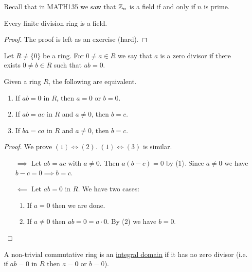 \documentclass[11pt]{article}
\begin{document}
\begin{remark}
    Recall that in MATH135 we saw that $\mathbb{Z}_n$ is a field if and only if $n$ is prime.
\end{remark}

\begin{theorem}
    Every finite division ring is a field.
\end{theorem}

\begin{proof}
    The proof is left as an exercise (hard).
\end{proof}

\begin{definition}
    Let $R\neq\{0\}$ be a ring. For $0\neq a\in R$ we say that $a$ is a \ul{zero divisor} if there exists $0\neq b\in R$ such that $ab=0$.
\end{definition}

\begin{proposition}
    Given a ring $R$, the following are equivalent.
    \begin{enumerate}
        \item If $ab=0$ in $R$, then $a=0$ or $b=0$.
        \item If $ab=ac$ in $R$ and $a\neq 0$, then $b=c$.
        \item If $ba=ca$ in $R$ and $a\neq0$, then $b=c$.
    \end{enumerate}
\end{proposition}

\begin{proof}
    We prove $(1)\iff(2)$. $(1)\iff(3)$ is similar.
    \begin{itemize}
        \item[$\implies$] Let $ab=ac$ with $a\neq 0$. Then $a(b-c)=0$ by (1). Since $a\neq 0$ we have $b-c=0\implies b=c$.
        
        \item[$\impliedby$] Let $ab=0$ in $R$. We have two cases:
        \begin{enumerate}
            \item If $a=0$ then we are done.
            \item If $a\neq0$ then $ab=0=a\cdot0$. By (2) we have $b=0$.
        \end{enumerate}
    \end{itemize}
\end{proof}

\begin{definition}
    A non-trivial commutative ring is an \ul{integral domain} if it has no zero divisor (i.e. if $ab=0$ in $R$ then $a=0$ or $b=0$).
\end{definition}
\end{document}

